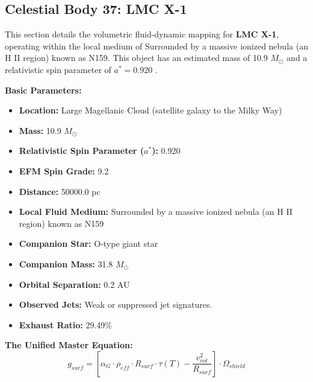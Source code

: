 \documentclass[11pt, a4paper]{article}
\begin{document}
\clearpage
\subsection{Celestial Body 37: LMC X-1}
This section details the volumetric fluid-dynamic mapping for \textbf{LMC X-1}, operating within the local medium of Surrounded by a massive ionized nebula (an H II region) known as N159. This object has an estimated mass of 10.9 $M_{\odot}$ and a relativistic spin parameter of $a^* = 0.920$ \cite{orosz2009, simbad}.

\vspace{0.5em}
\noindent \textbf{Basic Parameters:}
\begin{itemize}
  \item \textbf{Location:} Large Magellanic Cloud (satellite galaxy to the Milky Way)
  \item \textbf{Mass:} 10.9 $M_{\odot}$
  \item \textbf{Relativistic Spin Parameter ($a^*$):} 0.920
  \item \textbf{EFM Spin Grade:} 9.2
  \item \textbf{Distance:} 50000.0 pc
  \item \textbf{Local Fluid Medium:} Surrounded by a massive ionized nebula (an H II region) known as N159
  \item \textbf{Companion Star:} O-type giant star
  \item \textbf{Companion Mass:} 31.8 $M_{\odot}$
  \item \textbf{Orbital Separation:} 0.2 AU
  \item \textbf{Observed Jets:} Weak or suppressed jet signatures.
  \item \textbf{Exhaust Ratio:} 29.49\%
\end{itemize}

\vspace{0.5em}
\noindent \textbf{The Unified Master Equation:}
$$ g_{surf} = \left[ \alpha_G \cdot \rho_{eff} \cdot R_{surf} \cdot \tau(T) - \frac{v_{rot}^2}{R_{surf}} \right] \cdot \Omega_{shield} $$
\end{document}
